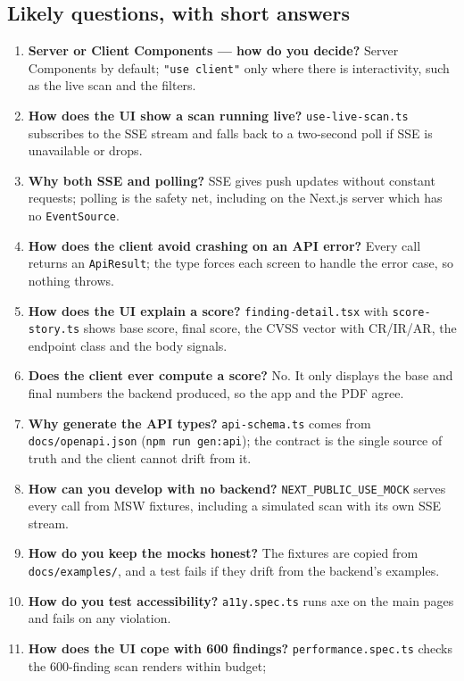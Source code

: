 \subsection{Likely questions, with short answers}
\begin{enumerate}[leftmargin=*,itemsep=3pt]
\item \textbf{Server or Client Components --- how do you decide?} Server
Components by default; \texttt{"use client"} only where there is interactivity,
such as the live scan and the filters.
\item \textbf{How does the UI show a scan running live?} \texttt{use-live-scan.ts}
subscribes to the SSE stream and falls back to a two-second poll if SSE is
unavailable or drops.
\item \textbf{Why both SSE and polling?} SSE gives push updates without constant
requests; polling is the safety net, including on the Next.js server which has no
\texttt{EventSource}.
\item \textbf{How does the client avoid crashing on an API error?} Every call
returns an \texttt{ApiResult}; the type forces each screen to handle the error
case, so nothing throws.
\item \textbf{How does the UI explain a score?} \texttt{finding-detail.tsx} with
\texttt{score-story.ts} shows base score, final score, the CVSS vector with
CR/IR/AR, the endpoint class and the body signals.
\item \textbf{Does the client ever compute a score?} No. It only displays the
base and final numbers the backend produced, so the app and the PDF agree.
\item \textbf{Why generate the API types?} \texttt{api-schema.ts} comes from
\texttt{docs/openapi.json} (\texttt{npm run gen:api}); the contract is the single
source of truth and the client cannot drift from it.
\item \textbf{How can you develop with no backend?} \texttt{NEXT\_PUBLIC\_USE\_MOCK}
serves every call from MSW fixtures, including a simulated scan with its own SSE
stream.
\item \textbf{How do you keep the mocks honest?} The fixtures are copied from
\texttt{docs/examples/}, and a test fails if they drift from the backend's
examples.
\item \textbf{How do you test accessibility?} \texttt{a11y.spec.ts} runs axe on
the main pages and fails on any violation.
\item \textbf{How does the UI cope with 600 findings?}
\texttt{performance.spec.ts} checks the 600-finding scan renders within budget;

\end{enumerate}
